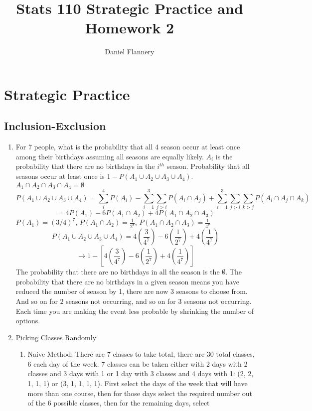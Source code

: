 \documentclass[11pt, oneside]{article}   	%
\title{Stats 110 Strategic Practice and Homework 2}
\author{Daniel Flannery}
\begin{document}
\maketitle
\tableofcontents

\section{Strategic Practice}
\subsection{Inclusion-Exclusion}	
	\begin{enumerate}
		\item For 7 people, what is the probability that all 4 season occur at least once among their birthdays assuming all seasons are equally likely.
			$A_i$ is the probability that there are no birthdays in the $i^{th}$ season. Probability that all seasons occur at least once is $1 - P(A_1 \cup A_2 \cup A_3 \cup A_4)$.
			$A_1 \cap A_2 \cap A_3 \cap A_4 = \emptyset$
			\[
				P(A_1 \cup A_2 \cup A_3 \cup A_4) = \sum_{i}^{4}P(A_i) - \sum_{i=1}^{3}\sum_{j > i}P(A_i \cap A_j) + \sum_{i=1}^{3}\sum_{j>i}\sum_{k>j}P(A_i \cap A_j \cap A_k)
			\]
			\[
				= 4P(A_1) - 6P(A_1 \cap A_2) + 4P(A_1 \cap A_2 \cap A_3)
			\]
			$P(A_1) = (3 / 4)^{7}$,
			$P(A_1 \cap A_2) = \frac{1}{2^{7}}$,
			$P(A_1 \cap A_2 \cap A_3) = \frac{1}{4^{7}}$
			\[
				P(A_1 \cup A_2 \cup A_3 \cup A_4)  = 4(\frac{3}{4^{7}}) - 6(\frac{1}{2^{7}}) + 4(\frac{1}{4^{7}})
			\]
			\[
				\rightarrow 1 - [4(\frac{3}{4^{7}}) - 6(\frac{1}{2^{7}}) + 4(\frac{1}{4^{7}})]
			\]
			The probability that there are no birthdays in all the season is the $\emptyset$. The probability that there are no birthdays in a given season means you have reduced the number of season by 1,
			there are now 3 seasons to choose from. And so on for 2 seasons not occurring, and so on for 3 seasons not occurring. Each time you are making the event less probable by shrinking the number of options.
		\item Picking Classes Randomly
			\begin{enumerate}
				\item Naive Method: There are 7 classes to take total, there are 30 total classes, 6 each day of the week. 7 classes can be taken either with 2 days with 2 classes and 3 days with 1 or 1 day with 3 classes and 4 days with 1:
					(2, 2, 1, 1, 1) or (3, 1, 1, 1, 1). First select the days of the week that will have more than one course, then for those days select the required number out of the 6 possible classes, then for the remaining days, select

\end{enumerate}
\end{enumerate}
\end{document}
